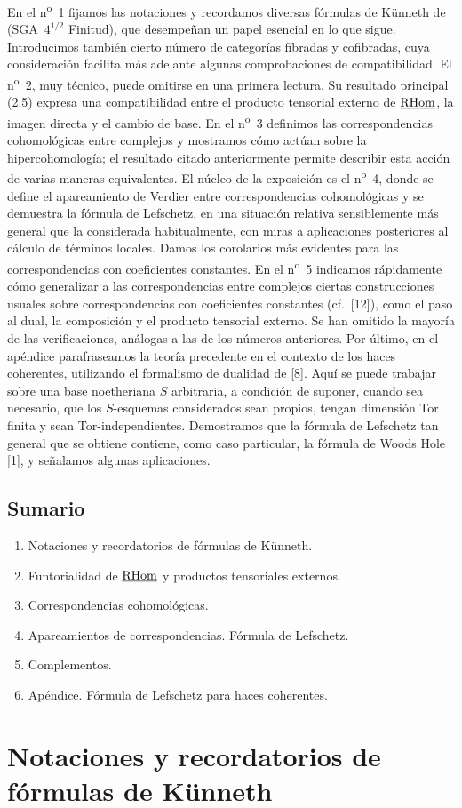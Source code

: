 En el n\textsuperscript{o}~1 fijamos las notaciones y recordamos diversas fórmulas de Künneth de (SGA~$4^{1/2}$ Finitud), que desempeñan un papel esencial en lo que sigue. Introducimos también cierto número de categorías fibradas y cofibradas, cuya consideración facilita más adelante algunas comprobaciones de compatibilidad. El n\textsuperscript{o}~2, muy técnico, puede omitirse en una primera lectura. Su resultado principal (2.5) expresa una compatibilidad entre el producto tensorial externo de $\underline{\mathrm{RHom}}$, la imagen directa y el cambio de base. En el n\textsuperscript{o}~3 definimos las correspondencias cohomológicas entre complejos y mostramos cómo actúan sobre la hipercohomología; el resultado citado anteriormente permite describir esta acción de varias maneras equivalentes. El núcleo de la exposición es el n\textsuperscript{o}~4, donde se define el apareamiento de Verdier entre correspondencias cohomológicas y se demuestra la fórmula de Lefschetz, en una situación relativa sensiblemente más general que la considerada habitualmente, con miras a aplicaciones posteriores al cálculo de términos locales. Damos los corolarios más evidentes para las correspondencias con coeficientes constantes. En el n\textsuperscript{o}~5 indicamos rápidamente cómo generalizar a las correspondencias entre complejos ciertas construcciones usuales sobre correspondencias con coeficientes constantes (cf.~[12]), como el paso al dual, la composición y el producto tensorial externo. Se han omitido la mayoría de las verificaciones, análogas a las de los números anteriores. Por último, en el apéndice parafraseamos la teoría precedente en el contexto de los haces coherentes, utilizando el formalismo de dualidad de [8]. Aquí se puede trabajar sobre una base noetheriana $S$ arbitraria, a condición de suponer, cuando sea necesario, que los $S$-esquemas considerados sean propios, tengan dimensión Tor finita y sean Tor-independientes. Demostramos que la fórmula de Lefschetz tan general que se obtiene contiene, como caso particular, la fórmula de Woods Hole [1], y señalamos algunas aplicaciones.

\subsection*{Sumario}
\begin{enumerate}[label=\arabic*.]
\item Notaciones y recordatorios de fórmulas de Künneth.
\item Funtorialidad de $\underline{\mathrm{RHom}}$ y productos tensoriales externos.
\item Correspondencias cohomológicas.
\item Apareamientos de correspondencias. Fórmula de Lefschetz.
\item Complementos.
\item Apéndice. Fórmula de Lefschetz para haces coherentes.
\end{enumerate}

\setcounter{section}{0}%
\section{Notaciones y recordatorios de fórmulas de Künneth}
